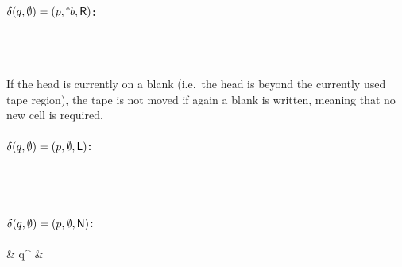 \documentclass[a4paper,UKenglish,cleveref, autoref]{lipics-v2019}
\begin{document}
\paragraph*{$\delta(q, \emptyset) = (p, \degree b, \textsf{R})$:}
\begin{center}
   \\[3ex]
   \\[3ex]
\end{center}

If the head is currently on a blank (i.e.\ the head is beyond the currently used tape region), the tape is not moved if again a blank is written, meaning that no new cell is required.
\paragraph*{$\delta(q, \emptyset) = (p, \emptyset, \textsf{L})$:}
\begin{center}
   \\[3ex]
   \\[3ex]
\end{center}

\paragraph*{$\delta(q, \emptyset) = (p, \emptyset, \textsf{N})$:}
\begin{center}
   {\blank & q^{\blank} & } \\[3ex]
   \\[3ex]
\end{center}
\end{document}
